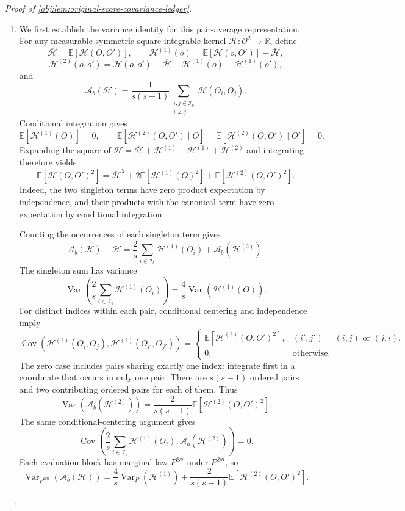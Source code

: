 \begin{proof}[Proof of \cref{obj:lem:original-score-covariance-ledger}]
\begin{enumerate}
\item We first establish the variance identity for this pair-average representation. For any measurable symmetric square-integrable kernel
\(\mathscr H:\mathcal O^2\to\mathbb R\), define
\[
\overline{\mathscr H}=\mathbb E[\mathscr H(O,O')],
\qquad
\mathscr H^{(1)}(o)
=
\mathbb E[\mathscr H(o,O')]-\overline{\mathscr H},
\]
\[
\mathscr H^{(2)}(o,o')
=
\mathscr H(o,o')
-\overline{\mathscr H}
-\mathscr H^{(1)}(o)
-\mathscr H^{(1)}(o'),
\]
and
\[
\mathscr A_b(\mathscr H)
=
\frac1{s(s-1)}
\sum_{\substack{i,j\in\mathcal I_b\\i\ne j}}
\mathscr H(O_i,O_j).
\]
Conditional integration gives
\[
\mathbb E[\mathscr H^{(1)}(O)]=0,
\qquad
\mathbb E[\mathscr H^{(2)}(O,O')\mid O]
=
\mathbb E[\mathscr H^{(2)}(O,O')\mid O']
=
0.
\]
Expanding the square of
\(\mathscr H=\overline{\mathscr H}+\mathscr H^{(1)}+\mathscr H^{(1)}+\mathscr H^{(2)}\)
and integrating therefore yields
\[
\mathbb E[\mathscr H(O,O')^2]
=
\overline{\mathscr H}^{\,2}
+
2\mathbb E[\mathscr H^{(1)}(O)^2]
+
\mathbb E[\mathscr H^{(2)}(O,O')^2].
\]
Indeed, the two singleton terms have zero product expectation by independence, and their products with the canonical term have zero expectation by conditional integration.

Counting the occurrences of each singleton term gives
\[
\mathscr A_b(\mathscr H)-\overline{\mathscr H}
=
\frac2s\sum_{i\in\mathcal I_b}\mathscr H^{(1)}(O_i)
+
\mathscr A_b(\mathscr H^{(2)}).
\]
The singleton sum has variance
\[
\operatorname{Var}\!\left(
\frac2s\sum_{i\in\mathcal I_b}\mathscr H^{(1)}(O_i)
\right)
=
\frac4s\operatorname{Var}(\mathscr H^{(1)}(O)).
\]
For distinct indices within each pair, conditional centering and independence imply
\[
\operatorname{Cov}\!\left(
\mathscr H^{(2)}(O_i,O_j),
\mathscr H^{(2)}(O_{i'},O_{j'})
\right)
=
\begin{cases}
\mathbb E[\mathscr H^{(2)}(O,O')^2],
&(i',j')=(i,j)\text{ or }(j,i),\\
0,&\text{otherwise}.
\end{cases}
\]
The zero case includes pairs sharing exactly one index: integrate first in a coordinate that occurs in only one pair. There are \(s(s-1)\) ordered pairs and two contributing ordered pairs for each of them. Thus
\[
\operatorname{Var}(\mathscr A_b(\mathscr H^{(2)}))
=
\frac{2}{s(s-1)}
\mathbb E[\mathscr H^{(2)}(O,O')^2].
\]
The same conditional-centering argument gives
\[
\operatorname{Cov}\!\left(
\frac2s\sum_{i\in\mathcal I_b}\mathscr H^{(1)}(O_i),
\mathscr A_b(\mathscr H^{(2)})
\right)=0.
\]
Each evaluation block has marginal law \(P^{\otimes s}\) under \(P^{\otimes n}\), so
\[
\operatorname{Var}_{P^{\otimes n}}(\mathscr A_b(\mathscr H))
=
\frac4s\operatorname{Var}_P(\mathscr H^{(1)})
+
\frac{2}{s(s-1)}
\mathbb E[\mathscr H^{(2)}(O,O')^2].
\]


\end{enumerate}
\end{proof}
